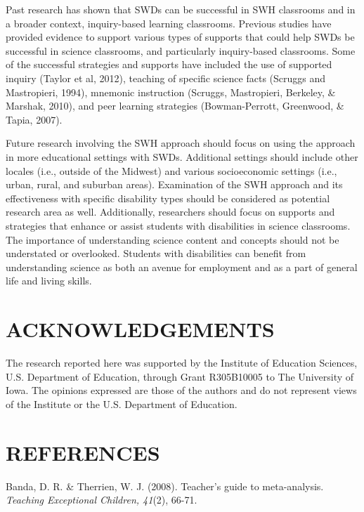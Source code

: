 \documentclass[11.5pt]{sig-alternate} %
\begin{document}
\begin{large}
Past research has shown that SWDs can be successful in SWH classrooms and in a broader context, inquiry-based learning classrooms.  Previous studies have provided evidence to support various types of supports that could help SWDs be successful in science classrooms, and particularly inquiry-based classrooms.  Some of the successful strategies and supports have included the use of supported inquiry (Taylor et al, 2012), teaching of specific science facts (Scruggs and Mastropieri, 1994), mnemonic instruction (Scruggs, Mastropieri, Berkeley, \& Marshak, 2010), and peer learning strategies (Bowman-Perrott, Greenwood, \& Tapia, 2007).

Future research involving the SWH approach should focus on using the approach in more educational settings with SWDs.  Additional settings should include other locales (i.e., outside of the Midwest) and various socioeconomic settings (i.e., urban, rural, and suburban areas). Examination of the SWH approach and its effectiveness with specific disability types should be considered as potential research area as well.  Additionally, researchers should focus on supports and strategies that enhance or assist students with disabilities in science classrooms.   The importance of understanding science content and concepts should not be understated or overlooked.  Students with disabilities can benefit from understanding science as both an avenue for employment and as a part of general life and living skills.

\section*{ACKNOWLEDGEMENTS}

The research reported here was supported by the Institute of Education Sciences, U.S. Department of Education, through Grant R305B10005 to The University of Iowa. The opinions expressed are those of the authors and do not represent views of the Institute or the U.S. Department of Education.

\end{large}
\clearpage
\section*{REFERENCES}\par 

\leftskip 0.25in
\parindent -0.25in 

Banda, D. R. \& Therrien, W. J. (2008).  Teacher’s guide to meta-analysis.  \textit{Teaching Exceptional Children, 41}(2), 66-71.
\end{document}

